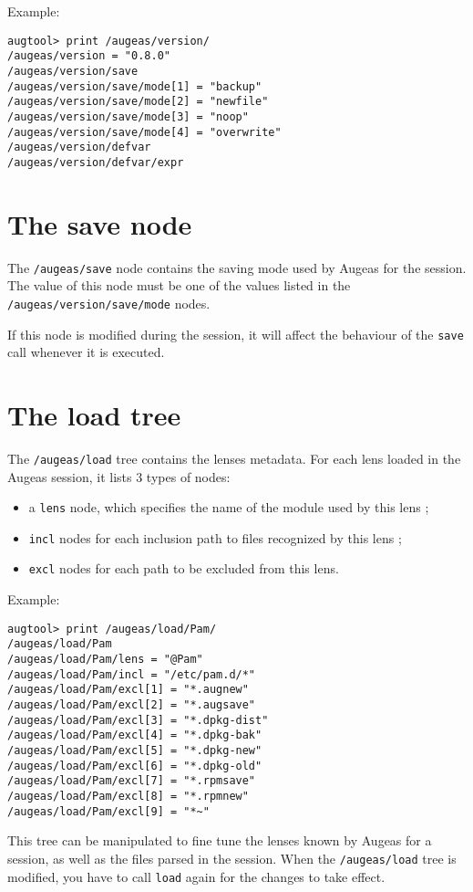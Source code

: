 Example:

\begin{verbatim}
augtool> print /augeas/version/
/augeas/version = "0.8.0"
/augeas/version/save
/augeas/version/save/mode[1] = "backup"
/augeas/version/save/mode[2] = "newfile"
/augeas/version/save/mode[3] = "noop"
/augeas/version/save/mode[4] = "overwrite"
/augeas/version/defvar
/augeas/version/defvar/expr
\end{verbatim}
\section{The save node}

\label{sec:save_node} 

The \verb!/augeas/save! node contains the saving mode used by Augeas for the session. The value of this node must be one of the values listed in the \verb!/augeas/version/save/mode! nodes.

If this node is modified during the session, it will affect the behaviour of the \verb!save! call whenever it is executed.

\section{The load tree}


The \verb!/augeas/load! tree contains the lenses metadata. For each lens loaded in the Augeas session, it lists 3 types of nodes:

\begin{itemize}
\item
  a \verb!lens! node, which specifies the name of the module used by this lens ;
\item
  \verb!incl! nodes for each inclusion path to files recognized by this lens ;
\item
  \verb!excl! nodes for each path to be excluded from this lens.
\end{itemize}

Example:

\begin{verbatim}
augtool> print /augeas/load/Pam/
/augeas/load/Pam
/augeas/load/Pam/lens = "@Pam"
/augeas/load/Pam/incl = "/etc/pam.d/*"
/augeas/load/Pam/excl[1] = "*.augnew"
/augeas/load/Pam/excl[2] = "*.augsave"
/augeas/load/Pam/excl[3] = "*.dpkg-dist"
/augeas/load/Pam/excl[4] = "*.dpkg-bak"
/augeas/load/Pam/excl[5] = "*.dpkg-new"
/augeas/load/Pam/excl[6] = "*.dpkg-old"
/augeas/load/Pam/excl[7] = "*.rpmsave"
/augeas/load/Pam/excl[8] = "*.rpmnew"
/augeas/load/Pam/excl[9] = "*~"
\end{verbatim}
This tree can be manipulated to fine tune the lenses known by Augeas for a session, as well as the files parsed in the session. When the \verb!/augeas/load! tree is modified, you have to call \verb!load! again for the changes to take effect.


